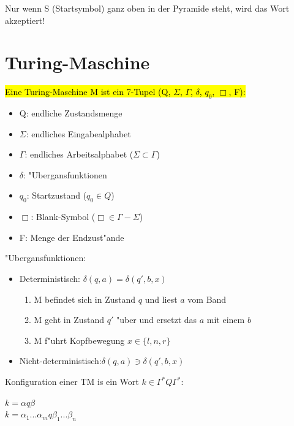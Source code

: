 \documentclass[11pt, a4paper]{scrartcl}
\begin{document}
\vspace{2em}

Nur wenn S (Startsymbol) ganz oben in der Pyramide steht, wird das Wort akzeptiert!

\newpage


\section{Turing-Maschine}

\hl{Eine Turing-Maschine M ist ein 7-Tupel (Q, $\Sigma$, $\Gamma$, $\delta$, $q_0$, $\Box$, F):}

\begin{itemize}
    \item Q: endliche Zustandsmenge
    \item $\Sigma$: endliches Eingabealphabet
    \item $\Gamma$: endliches Arbeitsalphabet ($\Sigma \subset \Gamma$)
    \item $\delta$: "Ubergansfunktionen
    \item $q_0$: Startzustand ($q_0 \in Q$)
    \item $\Box$: Blank-Symbol ($\Box \in \Gamma - \Sigma$)
    \item F: Menge der Endzust"ande
\end{itemize}

\vspace{1em}

"Ubergansfunktionen:
\begin{itemize}
    \item Deterministisch: \qquad \qquad $\delta(q, a) = \delta(q', b, x)$
    \begin{enumerate}
        \item M befindet sich in Zustand $q$ und liest $a$ vom Band
        \item M geht in Zustand $q'$ "uber und ersetzt das $a$ mit einem $b$
        \item M f"uhrt Kopfbewegung $x \in \{l, n, r\}$
      \end{enumerate}

    \item Nicht-deterministisch:\qquad$\delta(q, a) \ni \delta(q', b, x)$
\end{itemize}

\vspace{1em}

Konfiguration einer TM is ein Wort $k \in \Gamma^* Q \Gamma^*$:

$k = \alpha q \beta$\\
$k = \alpha_1...\alpha_m q \beta_1...\beta_n$
\end{document}
